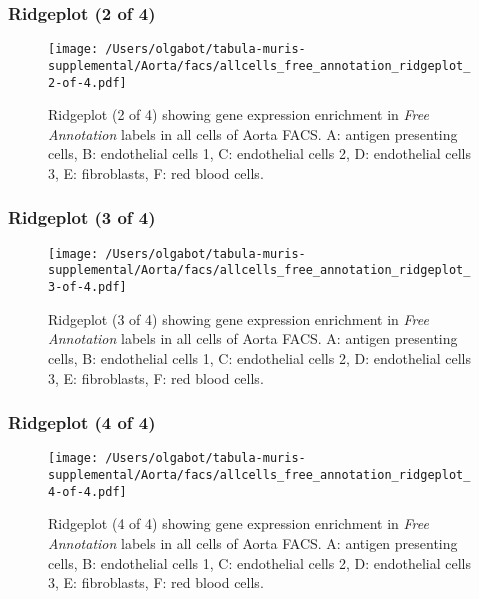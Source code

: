 \clearpage

\subsubsection{Ridgeplot (2 of 4)}
\begin{figure}[h]
\centering
\texttt{[image: /Users/olgabot/tabula-muris-supplemental/Aorta/facs/allcells\_free\_annotation\_ridgeplot\_2-of-4.pdf]}

\caption{ Ridgeplot (2 of 4)  showing gene expression enrichment in \emph{Free Annotation} labels in all cells of Aorta FACS. A: antigen presenting cells, B: endothelial cells 1, C: endothelial cells 2, D: endothelial cells 3, E: fibroblasts, F: red blood cells.}
\end{figure}


\clearpage

\subsubsection{Ridgeplot (3 of 4)}
\begin{figure}[h]
\centering
\texttt{[image: /Users/olgabot/tabula-muris-supplemental/Aorta/facs/allcells\_free\_annotation\_ridgeplot\_3-of-4.pdf]}

\caption{ Ridgeplot (3 of 4)  showing gene expression enrichment in \emph{Free Annotation} labels in all cells of Aorta FACS. A: antigen presenting cells, B: endothelial cells 1, C: endothelial cells 2, D: endothelial cells 3, E: fibroblasts, F: red blood cells.}
\end{figure}


\clearpage

\subsubsection{Ridgeplot (4 of 4)}
\begin{figure}[h]
\centering
\texttt{[image: /Users/olgabot/tabula-muris-supplemental/Aorta/facs/allcells\_free\_annotation\_ridgeplot\_4-of-4.pdf]}

\caption{ Ridgeplot (4 of 4)  showing gene expression enrichment in \emph{Free Annotation} labels in all cells of Aorta FACS. A: antigen presenting cells, B: endothelial cells 1, C: endothelial cells 2, D: endothelial cells 3, E: fibroblasts, F: red blood cells.}
\end{figure}


\clearpage

